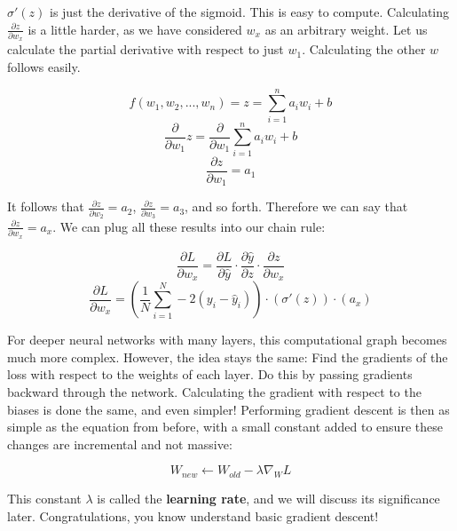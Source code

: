     $\sigma'(z)$ is just the derivative of the sigmoid. This is easy to compute. Calculating $\frac{\partial z}{\partial w_x}$ is a little harder, as we have considered $w_x$ as an arbitrary weight. Let us calculate the partial derivative with respect to just $w_1$. Calculating the other $w$ follows easily. 

    $$f(w_1, w_2,...,w_n) = z = \sum_{i=1}^n a_iw_i + b$$
    $$\frac{\partial}{\partial w_1}z = \frac{\partial}{\partial w_1}\sum_{i=1}^n a_iw_i + b$$
    $$\frac{\partial z}{\partial w_1} = a_1$$

    It follows that $\frac{\partial z}{\partial w_2} = a_2$, $\frac{\partial z}{\partial w_3} = a_3$, and so forth. Therefore we can say that $\frac{\partial z}{\partial w_x} = a_x$. We can plug all these results into our chain rule:

    $$\frac{\partial L}{\partial w_x} = \frac{\partial L}{\partial \hat{y}}\cdot\frac{\partial \hat{y}}{\partial z}\cdot\frac{\partial z}{\partial w_x}$$
    $$\frac{\partial L}{\partial w_x} =  (\frac{1}{N}\sum^{N}_{i=1} -2(y_i - \hat{y}_i)) \cdot (\sigma'(z)) \cdot (a_x)$$

    For deeper neural networks with many layers, this computational graph becomes much more complex. However, the idea stays the same: Find the gradients of the loss with respect to the weights of each layer. Do this by passing gradients backward through the network. Calculating the gradient with respect to the biases is done the same, and even simpler! Performing gradient descent is then as simple as the equation from before, with a small constant added to ensure these changes are incremental and not massive:

    $$W_{new} \leftarrow W_{old} - \lambda\nabla_W L$$

    This constant $\lambda$ is called the \textbf{learning rate}, and we will discuss its significance later. Congratulations, you know understand basic gradient descent!

